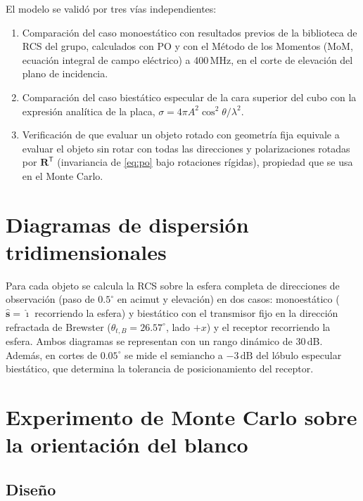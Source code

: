 \documentclass[11pt,a4paper]{report}
\newcommand{\dB}{\,\mathrm{dB}}
\newcommand{\uv}[1]{\hat{\bm{#1}}}
\begin{document}
El modelo se validó por tres vías independientes:
\begin{enumerate}[itemsep=2pt]
  \item Comparación del caso monoestático con resultados previos de la
  biblioteca de RCS del grupo, calculados con PO y con el Método de los
  Momentos (MoM, ecuación integral de campo eléctrico) a 400\,MHz, en el
  corte de elevación del plano de incidencia.
  \item Comparación del caso biestático especular de la cara superior del
  cubo con la expresión analítica de la placa,
  $\sigma=4\pi A^2\cos^2\theta/\lambda^2$.
  \item Verificación de que evaluar un objeto rotado con geometría fija
  equivale a evaluar el objeto sin rotar con todas las direcciones y
  polarizaciones rotadas por $\mathbf{R}^{\mathsf T}$ (invariancia de
  \eqref{eq:po} bajo rotaciones rígidas), propiedad que se usa en el
  Monte Carlo.
\end{enumerate}

\section{Diagramas de dispersión tridimensionales}

Para cada objeto se calcula la RCS sobre la esfera completa de direcciones
de observación (paso de $0.5^\circ$ en acimut y elevación) en dos casos:
monoestático ($\uv{s}=\uv{\imath}$ recorriendo la esfera) y biestático con
el transmisor fijo en la dirección refractada de Brewster
($\theta_{t,B}=26.57^\circ$, lado $+x$) y el receptor recorriendo la esfera.
Ambos diagramas se representan con un rango dinámico de 30\,dB. Además, en
cortes de $0.05^\circ$ se mide el semiancho a $-3\dB$ del lóbulo especular
biestático, que determina la tolerancia de posicionamiento del receptor.

\section{Experimento de Monte Carlo sobre la orientación del blanco}
\label{sec:mc}

\subsection{Diseño}
\end{document}
